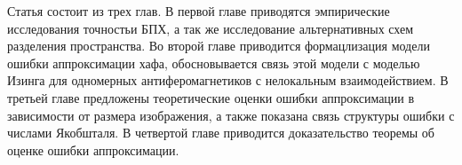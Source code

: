 Статья состоит из трех глав.
В первой главе приводятся эмпирические исследования точностьи БПХ, а так же исследование альтернативных схем разделения пространства.
Во второй главе приводится формацлизация модели ошибки аппроксимации хафа, обосновывается связь этой модели с моделью Изинга для одномерных антиферомагнетиков с нелокальным взаимодействием.
В третьей главе предложены теоретические оценки ошибки аппроксимации в зависимости от размера изображения, а также показана связь структуры ошибки с числами Якобшталя.
В четвертой главе приводится доказательство теоремы об оценке ошибки аппроксимации.